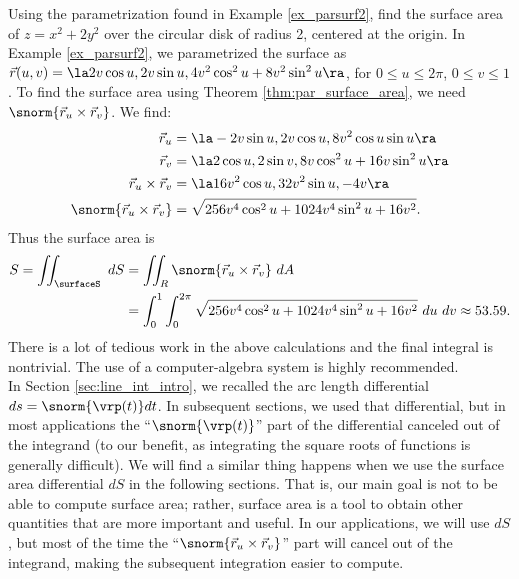 {Using the parametrization found in Example \ref{ex_parsurf2}, find the surface area of $z=x^2+2y^2$ over the circular disk of radius 2, centered at the origin.
}
{In Example \ref{ex_parsurf2}, we parametrized the surface as $\vec r(u,v) = \la 2v\cos u, 2v\sin u, 4v^2\cos^2u+8v^2\sin^2u\ra$, for $0\leq u\leq 2\pi$, $0\leq v\leq 1$. To find the surface area using Theorem \ref{thm:par_surface_area}, we need $\snorm{\vec r_u\times\vec r_v}$. We find:
\begin{align*}
\vec r_u &= \la -2v\sin u, 2v\cos u, 8v^2\cos u\sin u\ra\\
\vec r_v &= \la 2\cos u, 2\sin v, 8v\cos^2 u+16v\sin^2u\ra\\
\vec r_u\times\vec r_v &= \la 16v^2\cos u, 32v^2\sin u, -4v\ra\\
\snorm{\vec r_u\times\vec r_v} &= \sqrt{256v^4\cos^2u+1024v^4\sin^2u+16v^2}.
\end{align*}
Thus the surface area is
\begin{align*}
S = \iint_\surfaceS \ dS &= \iint_R\snorm{\vec r_u\times \vec r_v}\ dA \\
& = \int_0^1\int_0^{2\pi} \sqrt{256v^4\cos^2u+1024v^4\sin^2u+16v^2}\ du\ dv \approx 53.59.
\end{align*}
There is a lot of tedious work in the above calculations and the final integral is nontrivial. The use of a computer-algebra system is highly recommended.
}\\

In Section \ref{sec:line_int_intro}, we recalled the arc length differential $ds=\snorm{\vrp(t)}dt$. In subsequent sections, we used that differential, but in most applications the ``$\snorm{\vrp(t)}$'' part of the differential canceled out of the integrand (to our benefit, as integrating the square roots of functions is generally difficult). We will find a similar thing happens when we use the surface area differential $dS$ in the following sections. That is, our main goal is not to be able to compute surface area; rather, surface area is a tool to obtain other quantities that are more important and useful. In our applications, we will use $dS$, but most of the time the ``$\snorm{\vec r_u\times \vec r_v}$'' part will cancel out of the integrand, making the subsequent integration easier to compute.


